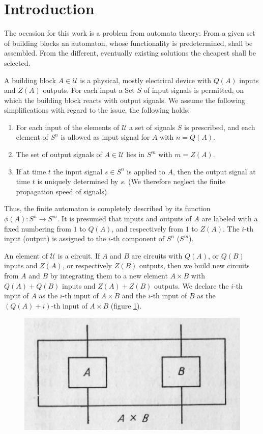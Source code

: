 \documentclass{article}
\begin{document}
\section{Introduction}
The occasion for this work is a problem from automata theory: From a given set of building blocks an automaton, whose functionality is predetermined, shall be assembled. From the different, eventually existing  solutions the cheapest shall be selected. 

A building block $A \in \mathcal{U}$ is a physical, mostly electrical device with $Q(A)$ inputs and $Z(A)$ outputs. For each input a Set $S$ of input signals is permitted, on which the building block reacts with output signals. We assume the following simplifications with regard to the issue, the following holds:

\begin{enumerate}
\item For each input of the elements of $\mathcal{U}$ a set of signals $S$ is prescribed, and each element of $S^n$ is allowed as input signal for $A$ with $n = Q(A)$.
\item The set of output signals of $A \in \mathcal{U}$ lies in $S^m$ with $m = Z(A)$.
\item If at time $t$ the input signal $s \in S^n$ is applied to $A$, then the output signal at time $t$ is uniquely determined by $s$. (We therefore neglect the finite propagation speed of signals).
\end{enumerate}

Thus, the finite automaton is completely described by its function $\phi(A):S^n \rightarrow S^m$. It is presumed that inputs and outputs of $A$ are labeled with a fixed numbering from $1$ to $Q(A)$, and respectively from $1$ to $Z(A)$. The $i$-th input (output) is assigned to the $i$-th component of $S^n$ ($S^m$). 

An element of $\mathcal{U}$ is a circuit. If $A$ and $B$ are circuits with $Q(A)$, or $Q(B)$ inputs and $Z(A)$, or respectively $Z(B)$ outputs, then we build new circuits from $A$ and $B$ by integrating them to a new element $A\times B$ with $Q(A)+Q(B)$ inputs and $Z(A)+Z(B)$ outputs. We declare the $i$-th input of $A$ as the $i$-th input of $A\times B$ and the $i$-th input of $B$ as the $(Q(A) + i)$-th input of $A\times B$ (figure \ref{fig:figure1}).

\begin{figure}
\includegraphics[]{figure1.png}
\caption{}
\label{fig:figure1}
\end{figure}
\end{document}

